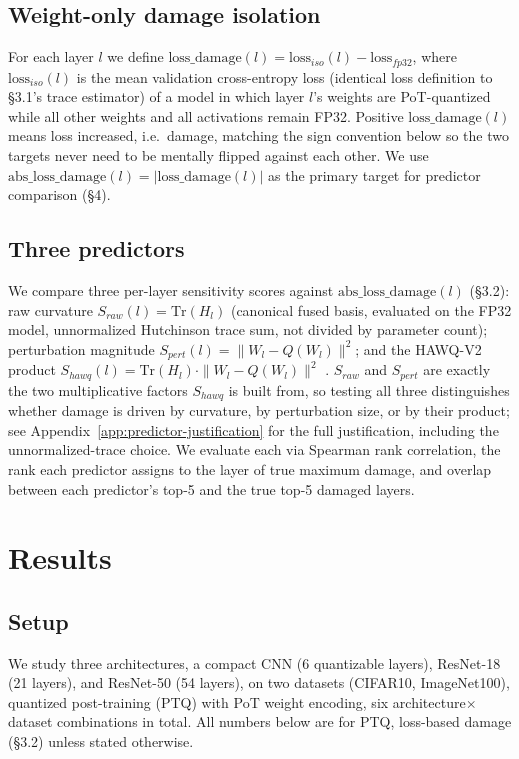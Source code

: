 \documentclass{article}
\begin{document}
\subsection{Weight-only damage isolation}
For each layer $l$ we define $\mathrm{loss\_damage}(l) = \mathrm{loss}_{iso}(l) - \mathrm{loss}_{fp32}$, where $\mathrm{loss}_{iso}(l)$ is the mean validation cross-entropy loss (identical loss definition to \S3.1's trace estimator) of a model in which layer $l$'s weights are PoT-quantized while all other weights and all activations remain FP32. Positive $\mathrm{loss\_damage}(l)$ means loss increased, i.e.\ damage, matching the sign convention below so the two targets never need to be mentally flipped against each other. We use $\mathrm{abs\_loss\_damage}(l) = |\mathrm{loss\_damage}(l)|$ as the primary target for predictor comparison (\S4).


\subsection{Three predictors}
We compare three per-layer sensitivity scores against $\mathrm{abs\_loss\_damage}(l)$ (\S3.2): raw curvature $S_{raw}(l) = \mathrm{Tr}(H_l)$ (canonical fused basis, evaluated on the FP32 model, unnormalized Hutchinson trace sum, not divided by parameter count); perturbation magnitude $S_{pert}(l) = \|W_l - Q(W_l)\|^2$; and the HAWQ-V2 product $S_{hawq}(l) = \mathrm{Tr}(H_l)\cdot\|W_l - Q(W_l)\|^2$ \citep{dong_hawqv2_2020}. $S_{raw}$ and $S_{pert}$ are exactly the two multiplicative factors $S_{hawq}$ is built from, so testing all three distinguishes whether damage is driven by curvature, by perturbation size, or by their product; see Appendix~\ref{app:predictor-justification} for the full justification, including the unnormalized-trace choice. We evaluate each via Spearman rank correlation, the rank each predictor assigns to the layer of true maximum damage, and overlap between each predictor's top-5 and the true top-5 damaged layers.

\section{Results}

\subsection{Setup}
We study three architectures, a compact CNN (6 quantizable layers), ResNet-18 (21 layers), and ResNet-50 (54 layers), on two datasets (CIFAR10, ImageNet100), quantized post-training (PTQ) with PoT weight encoding, six architecture$\times$dataset combinations in total. All numbers below are for PTQ, loss-based damage (\S3.2) unless stated otherwise.
\end{document}
